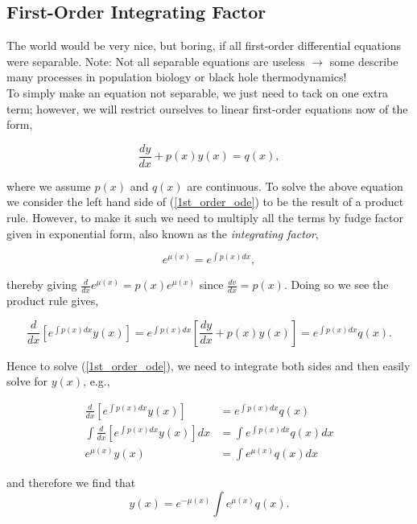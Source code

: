 %
%

\subsection{First-Order Integrating Factor}

The world would be very nice, but boring, if all first-order differential equations were separable. Note: Not all separable equations are useless $\rightarrow$ some describe many processes in population biology or black hole thermodynamics! \\

To simply make an equation not separable, we just need to tack on one extra term; however, we will restrict ourselves to linear first-order equations now of the form,

\begin{equation}
\label{1st_order_ode} \frac{dy}{dx} + p(x) y(x) = q(x),
\end{equation}

where we assume $p(x)$ and $q(x)$ are continuous. To solve the above equation we consider the left hand side of (\ref{1st_order_ode}) to be the result of a product rule. However, to make it such we need to multiply all the terms by fudge factor given in exponential form, also known as the \emph{integrating factor},

$$e^{\mu(x)}  = e^{\int p(x) dx},$$

thereby giving $\frac{d}{dx} e^{\mu(x)} = p(x) e^{\mu(x)}$ since $\frac{dv}{dx} = p(x).$ Doing so we see the product rule gives, 

$$\frac{d}{dx} \left[ e^{\int p(x) dx } y(x) \right] = e^{\int p(x) dx} \left[ \frac{dy}{dx} + p(x) y(x) \right] = e^{\int p(x) dx} q(x).$$

Hence to solve (\ref{1st_order_ode}), we need to integrate both sides and then easily solve for $y(x)$, e.g.,

\begin{align*}
\frac{d}{dx} \left[ e^{\int p(x) dx } y(x) \right] &= e^{\int p(x) dx} q(x) \\
\int \frac{d}{dx} \left[ e^{\int p(x) dx } y(x) \right] dx &= \int e^{\int p(x) dx} q(x) dx \\
e^{\mu(x) } y(x) &= \int e^{\mu(x) } q(x) dx
\end{align*}

and therefore we find that $$y(x) = e^{-\mu(x)}  \int e^{\mu(x)} q(x) .$$

